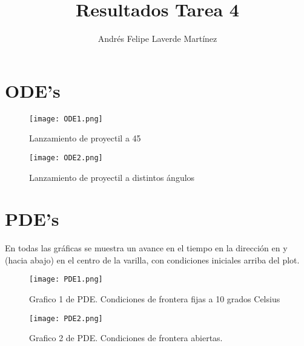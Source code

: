 \documentclass{article}
\begin{document}
\title{Resultados Tarea 4}
\author{Andrés Felipe Laverde Martínez}
\maketitle
\section{ODE's}
\begin{figure}[H]
	\texttt{[image: ODE1.png]}
		\caption{Lanzamiento de proyectil a 45}
\end{figure}

\begin{figure}[H]
	\texttt{[image: ODE2.png]}
		\caption{Lanzamiento de proyectil a distintos ángulos}
\end{figure}



\section{PDE's}
En todas las gráficas se muestra un avance en el tiempo en la dirección en y (hacia abajo) en el centro de la varilla, con condiciones iniciales arriba del plot.
\begin{figure}[H]
	\texttt{[image: PDE1.png]}
		\caption{Grafico 1 de PDE. Condiciones de frontera fijas a 10 grados Celsius}
\end{figure}

\begin{figure}[H]
	\texttt{[image: PDE2.png]}
		\caption{Grafico 2 de PDE. Condiciones de frontera abiertas.}
\end{figure}
\end{document}
